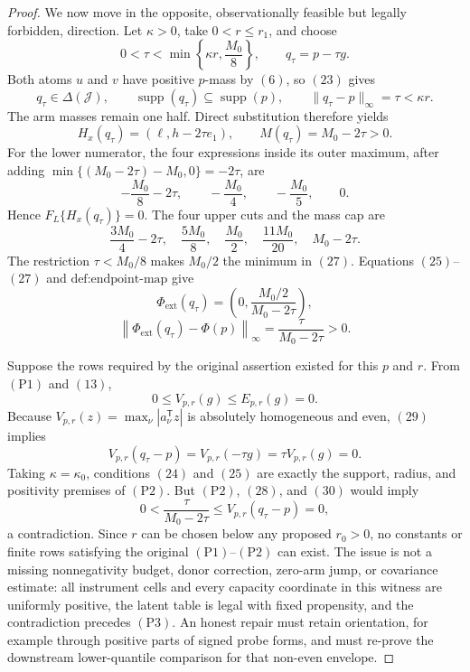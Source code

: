 \documentclass{article}
\begin{document}
\begin{proof}
We now move in the opposite, observationally feasible but legally forbidden, direction.  Let \(\kappa>0\), take \(0<r\le r_1\), and choose
\[
 0<\tau<\min\left\{\kappa r,\frac{M_0}{8}\right\},
 \qquad q_\tau=p-\tau g.
\tag{23}
\]
Both atoms \(u\) and \(v\) have positive \(p\)-mass by \((6)\), so \((23)\) gives
\[
 q_\tau\in\Delta(\mathcal J),\qquad
 \operatorname{supp}(q_\tau)\subseteq\operatorname{supp}(p),
 \qquad \lVert q_\tau-p\rVert_\infty=\tau<\kappa r.
\tag{24}
\]
The arm masses remain one half.  Direct substitution therefore yields
\[
 H_x(q_\tau)=\left(\ell,h-2\tau e_1\right),
 \qquad M(q_\tau)=M_0-2\tau>0.
\tag{25}
\]
For the lower numerator, the four expressions inside its outer maximum, after adding \(\min\{(M_0-2\tau)-M_0,0\}=-2\tau\), are
\[
 -\frac{M_0}{8}-2\tau,\qquad
 -\frac{M_0}{4},\qquad
 -\frac{M_0}{5},\qquad 0.
\tag{26}
\]
Hence \(F_L\{H_x(q_\tau)\}=0\).  The four upper cuts and the mass cap are
\[
 \frac{3M_0}{4}-2\tau,\quad
 \frac{5M_0}{8},\quad
 \frac{M_0}{2},\quad
 \frac{11M_0}{20},\quad
 M_0-2\tau.
\tag{27}
\]
The restriction \(\tau<M_0/8\) makes \(M_0/2\) the minimum in \((27)\).  Equations \((25)\)--\((27)\) and \(\text{def:endpoint-map}\) give
\[
 \Phi_{\mathrm{ext}}(q_\tau)
 =\left(0,\frac{M_0/2}{M_0-2\tau}\right),
\]
\[
 \left\lVert\Phi_{\mathrm{ext}}(q_\tau)-\Phi(p)\right\rVert_\infty
 =\frac{\tau}{M_0-2\tau}>0.
\tag{28}
\]

Suppose the rows required by the original assertion existed for this \(p\) and \(r\).  From \((\mathrm{P1})\) and \((13)\),
\[
 0\le V_{p,r}(g)\le E_{p,r}(g)=0.
\tag{29}
\]
Because \(V_{p,r}(z)=\max_\nu|a_\nu^{\mathsf T}z|\) is absolutely homogeneous and even, \((29)\) implies
\[
 V_{p,r}(q_\tau-p)=V_{p,r}(-\tau g)=\tau V_{p,r}(g)=0.
\tag{30}
\]
Taking \(\kappa=\kappa_0\), conditions \((24)\) and \((25)\) are exactly the support, radius, and positivity premises of \((\mathrm{P2})\).  But \((\mathrm{P2})\), \((28)\), and \((30)\) would imply
\[
 0<\frac{\tau}{M_0-2\tau}
 \le V_{p,r}(q_\tau-p)=0,
\]
a contradiction.  Since \(r\) can be chosen below any proposed \(r_0>0\), no constants or finite rows satisfying the original \((\mathrm{P1})\)--\((\mathrm{P2})\) can exist.  The issue is not a missing nonnegativity budget, donor correction, zero-arm jump, or covariance estimate: all instrument cells and every capacity coordinate in this witness are uniformly positive, the latent table is legal with fixed propensity, and the contradiction precedes \((\mathrm{P3})\).  An honest repair must retain orientation, for example through positive parts of signed probe forms, and must re-prove the downstream lower-quantile comparison for that non-even envelope.
\end{proof}
\end{document}
